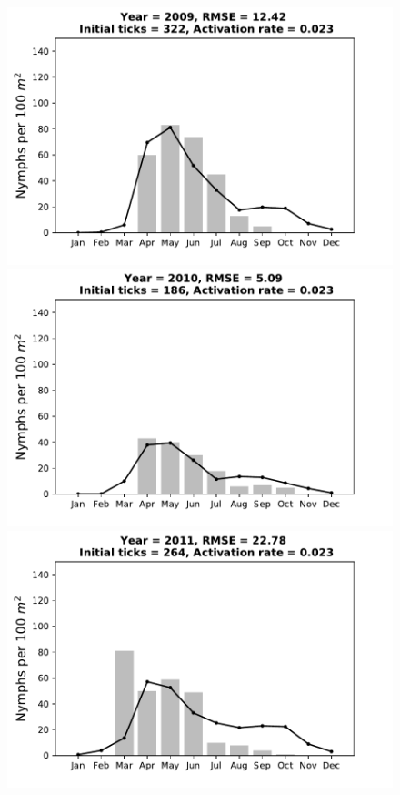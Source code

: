 \documentclass[a4paper, 11pt]{scrartcl}
\begin{document}
\begin{figure}[h!]
\centering
\begin{minipage}[c]{0.40\linewidth}
\includegraphics[width=\linewidth]{figures/s1/S1_2009}
\end{minipage}
\begin{minipage}[c]{0.40\linewidth}
\includegraphics[width=\linewidth]{figures/s1/S1_2010}
\end{minipage}
\begin{minipage}[c]{0.40\linewidth}
\includegraphics[width=\linewidth]{figures/s1/S1_2011}

\end{minipage}
\end{figure}
\end{document}
